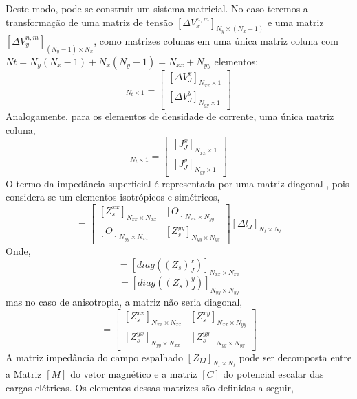 \documentclass[
	12pt,				%
	openright,			%
	oneside,			%
	a4paper,			%
	english,			%
	brazil				%
	]{abntex2}
\begin{document}
\begin{apendicesenv}
Deste modo,  pode-se construir um sistema matricial. No caso teremos a transformação de uma matriz de tensão $[\Delta V^{n,m}_x]_{N_y \times (N_x-1)}$ e uma matriz $[\Delta V^{n,m}_y]_{(N_y-1) \times N_x}$, como matrizes colunas em uma única matriz  coluna com $Nt=N_y(N_x-1)+N_x(N_y-1)=N_{xx}+N_{yy}$ elementos; 
\begin{equation}
    [\Delta V_J]_{N_t \times 1}= \begin{bmatrix}[\Delta V^{x}_J]_{N_{xx}\times 1} \\ [\Delta V^{y}_J]_{N_{yy}\times 1}\end{bmatrix}  
\end{equation}
Analogamente, para os elementos  de densidade de corrente, uma única matriz coluna,
\begin{equation}
    [J_I]_{N_t \times 1}= \begin{bmatrix} [J^{x}_J]_{N_{xx}\times 1} \\ [J^{y}_J]_{N_{yy}\times 1}\end{bmatrix}  
\end{equation}
O termo da impedância superficial é representada por uma matriz diagonal , pois considera-se um elementos isotrópicos e simétricos, 
\begin{equation}
   [Z_s]=\begin{bmatrix}[Z_s^{xx}]_{N_{xx}\times N_{xx}}& [O]_{N_{xx}\times N_{yy}}\\
   [O]_{N_{yy}\times N_{xx}}&[Z_s^{yy}]_{N_{yy}\times N_{yy}}
   \end{bmatrix}[\Delta l _J]_{N_t \times N_t}
\end{equation}
Onde,
\begin{equation}
    [Z_s^{xx}]=[diag (  (Z_s)_J^x)]_{N_{xx}\times N_{xx}}
\end{equation}
\begin{equation}
    [Z_s^{yy}]=[diag ((Z_s)_J^y)]_{N_{yy}\times N_{yy}}
\end{equation}
mas no caso de anisotropia, a matriz não seria diagonal,
\begin{equation}
   [Z_s]=\begin{bmatrix}[Z_s^{xx}]_{N_{xx}\times N_{xx}}& [Z_s^{xy}]_{N_{xx}\times N_{yy}}\\
   [Z_s^{yx}]_{N_{yy}\times N_{xx}}&[Z_s^{yy}]_{N_{yy}\times N_{yy}}
   \end{bmatrix}
\end{equation}
A matriz impedância do campo espalhado  $[Z_{IJ}]_{N_t \times N_t}$ pode ser decomposta entre a Matriz $[M]$ do vetor magnético e a matriz $[C]$ do potencial escalar das cargas elétricas. Os elementos dessas matrizes são definidas a seguir,

\end{apendicesenv}
\end{document}
